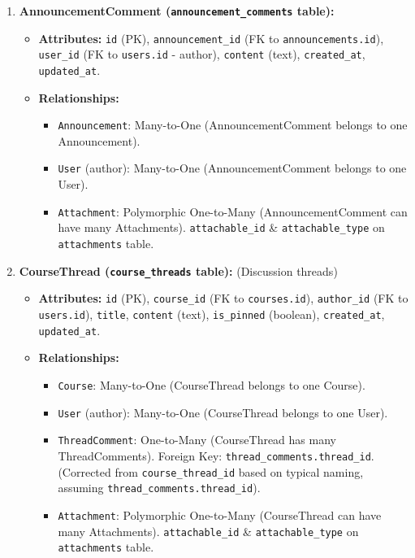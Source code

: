 \begin{enumerate}
\begin{itemize}
\begin{itemize}
        \end{itemize}
    \end{itemize}
    \item \textbf{AnnouncementComment (\texttt{announcement\_comments} table):}
    \begin{itemize}
        \item \textbf{Attributes:} \texttt{id} (PK), \texttt{announcement\_id} (FK to \texttt{announcements.id}), \texttt{user\_id} (FK to \texttt{users.id} - author), \texttt{content} (text), \texttt{created\_at}, \texttt{updated\_at}.
        \item \textbf{Relationships:}
        \begin{itemize}
            \item \texttt{Announcement}: Many-to-One (AnnouncementComment belongs to one Announcement).
            \item \texttt{User} (author): Many-to-One (AnnouncementComment belongs to one User).
            \item \texttt{Attachment}: Polymorphic One-to-Many (AnnouncementComment can have many Attachments). \texttt{attachable\_id} \& \texttt{attachable\_type} on \texttt{attachments} table.
        \end{itemize}
    \end{itemize}
    \item \textbf{CourseThread (\texttt{course\_threads} table):} (Discussion threads)
    \begin{itemize}
        \item \textbf{Attributes:} \texttt{id} (PK), \texttt{course\_id} (FK to \texttt{courses.id}), \texttt{author\_id} (FK to \texttt{users.id}), \texttt{title}, \texttt{content} (text), \texttt{is\_pinned} (boolean), \texttt{created\_at}, \texttt{updated\_at}.
        \item \textbf{Relationships:}
        \begin{itemize}
            \item \texttt{Course}: Many-to-One (CourseThread belongs to one Course).
            \item \texttt{User} (author): Many-to-One (CourseThread belongs to one User).
            \item \texttt{ThreadComment}: One-to-Many (CourseThread has many ThreadComments). Foreign Key: \texttt{thread\_comments.thread\_id}. (Corrected from \texttt{course\_thread\_id} based on typical naming, assuming \texttt{thread\_comments.thread\_id}).
            \item \texttt{Attachment}: Polymorphic One-to-Many (CourseThread can have many Attachments). \texttt{attachable\_id} \& \texttt{attachable\_type} on \texttt{attachments} table.

\end{itemize}
\end{itemize}
\end{enumerate}
